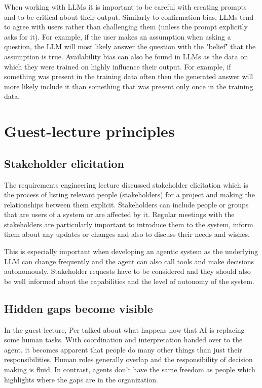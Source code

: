 \documentclass[11pt]{article}
\begin{document}
When working with LLMs it is important to be careful with creating prompts and to be critical about their output. Similarly to confirmation bias, LLMs tend to agree with users rather than challenging them (unless the prompt explicitly asks for it). For example, if the user  makes an assumption when asking a question, the LLM will most likely answer the question with the "belief" that the assumption is true.
Availability bias can also be found in LLMs as the data on which they were trained on highly influence their output. For example, if something was present in the training data often then the generated answer will more likely include it than something that was present only once in the training data.

\section{Guest-lecture principles}

\subsection{Stakeholder elicitation}

The requirements engineering lecture discussed stakeholder elicitation which is the process of listing relevant people (stakeholders) for a project and making the relationships between them explicit. Stakeholders can include people or groups that are users of a system or are affected by it. 
Regular meetings with the stakeholders are particularly important to introduce them to the system, inform them about any updates or changes and also to discuss their needs and wishes.

This is especially important when developing an agentic system as the underlying LLM can change frequently and the agent can also call tools and make decisions autonomously. Stakeholder requests have to be considered and they should also be well informed about the capabilities and the level of autonomy of the system.

\subsection{Hidden gaps become visible}

In the guest lecture, Per talked about what happens now that AI is replacing some human tasks. With coordination and interpretation handed over to the agent, it becomes apparent that people do many other things than just their responsibilities. Human roles generally overlap and the responsibility of decision making is fluid. In contrast, agents don't have the same freedom as people which highlights where the gaps are in the organization.
\end{document}
